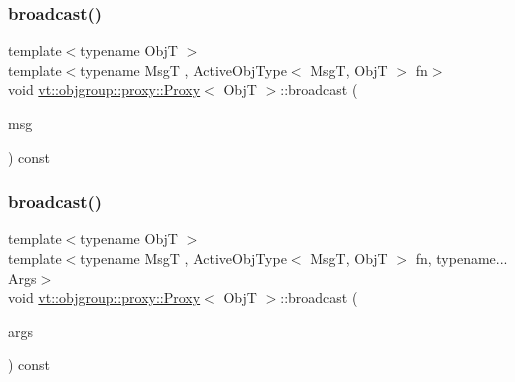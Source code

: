 \mbox{\label{structvt_1_1objgroup_1_1proxy_1_1_proxy_ad3841e2db7085583868956d97c537ffc}} 
\subsubsection{\texorpdfstring{broadcast()}{broadcast()}\hspace{0.1cm}{\footnotesize\ttfamily [2/3]}}
{\footnotesize\ttfamily template$<$typename ObjT $>$ \\
template$<$typename MsgT , Active\+Obj\+Type$<$ Msg\+T, Obj\+T $>$ fn$>$ \\
void \hyperlink{structvt_1_1objgroup_1_1proxy_1_1_proxy}{vt\+::objgroup\+::proxy\+::\+Proxy}$<$ ObjT $>$\+::broadcast (\begin{DoxyParamCaption}\item[{\hyperlink{namespacevt_ab2b3d506ec8e8d1540aede826d84a239}{Msg\+Shared\+Ptr}$<$ MsgT $>$}]{msg }\end{DoxyParamCaption}) const}

\mbox{\label{structvt_1_1objgroup_1_1proxy_1_1_proxy_ad4f1ddeb5b09f01643b17a93bbbe82e9}} 
\subsubsection{\texorpdfstring{broadcast()}{broadcast()}\hspace{0.1cm}{\footnotesize\ttfamily [3/3]}}
{\footnotesize\ttfamily template$<$typename ObjT $>$ \\
template$<$typename MsgT , Active\+Obj\+Type$<$ Msg\+T, Obj\+T $>$ fn, typename... Args$>$ \\
void \hyperlink{structvt_1_1objgroup_1_1proxy_1_1_proxy}{vt\+::objgroup\+::proxy\+::\+Proxy}$<$ ObjT $>$\+::broadcast (\begin{DoxyParamCaption}\item[{Args \&\&...}]{args }\end{DoxyParamCaption}) const}

